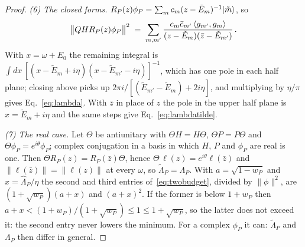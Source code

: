 \begin{proof}
\emph{(6) The closed forms.} $R_P(z)\phi_P=\sum_m c_m(z-\tilde E_m)^{-1}\lvert \tilde m \rangle$, so
\begin{equation*}
\bigl\lVert QHR_P(z)\phi_P\bigr\rVert^{2}\;=\;\sum_{m,m'}
\frac{c_m\bar c_{m'}\,\langle g_{m'},g_m \rangle}{(z-\tilde E_m)(\bar z-\tilde E_{m'})}\,.
\end{equation*}
With $x=\omega+E_0$ the remaining integral is
$\int dx\,[(x-\tilde E_m+i\eta)(x-\tilde E_{m'}-i\eta)]^{-1}$, which has one pole in each half
plane; closing above picks up $2\pi i/[(\tilde E_{m'}-\tilde E_m)+2i\eta]$, and multiplying by
$\eta/\pi$ gives Eq.~\eqref{eq:lambda}. With $\bar z$ in place of $z$ the pole in the upper half plane is
$x=\tilde E_m+i\eta$ and the same steps give Eq.~\eqref{eq:lambdatilde}.

\emph{(7) The real case.} Let $\Theta$ be antiunitary with $\Theta H=H\Theta$, $\Theta P=P\Theta$ and
$\Theta\phi_P=e^{i\theta}\phi_P$; complex conjugation in a basis in which $H$, $P$ and $\phi_P$ are real is one.
Then $\Theta R_P(z)=R_P(\bar z)\Theta$, hence $\Theta\,\ell(z)=e^{i\theta}\ell(\bar z)$ and
$\lVert\ell(\bar z)\rVert=\lVert\ell(z)\rVert$ at every $\omega$, so $\tilde\Lambda_P=\Lambda_P$. With
$a=\sqrt{1-w_P}$ and $x=\widehat\Lambda_P/\eta$ the second and third entries of~\eqref{eq:twobudget}, divided by
$\lVert\phi\rVert^{2}$, are $(1+\sqrt{w_P})(a+x)$ and $(a+x)^{2}$. If the former is below $1+w_P$ then
$a+x<(1+w_P)/(1+\sqrt{w_P})\le1\le1+\sqrt{w_P}$, so the latter does not exceed it: the second entry never lowers
the minimum. For a complex $\phi_P$ it can: $\tilde\Lambda_P$ and $\Lambda_P$ then differ in general.
\end{proof}
